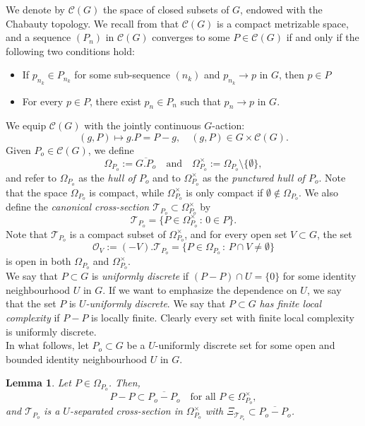 \documentclass[12pt,reqno,a4paper]{amsart}
\numberwithin{equation}{section}
\newcommand{\cT}{\mathcal{T}}
\newcommand{\ra}{\rightarrow}
\newcommand{\qand}{\quad \textrm{and} \quad}
\theoremstyle{theorem}
\newtheorem{lemma}[theorem]{Lemma}
\theoremstyle{task}
\theoremstyle{definition}
\begin{document}
We denote by $\mathscr{C}(G)$ the space of closed subsets of $G$, endowed with the Chabauty topology. We recall from \cite[Section E.1]{BP} that 
$\mathscr{C}(G)$ is a compact metrizable space, and a sequence $(P_n)$ in $\mathscr{C}(G)$ converges to some $P \in \mathscr{C}(G)$ if and only if the following two conditions hold:
\begin{itemize}
\item[(i)] If $p_{n_k} \in P_{n_k}$ for some sub-sequence $(n_k)$ and $p_{n_k} \ra p$ in $G$, then $p\in P$ \vspace{0.1cm}
\item[(ii)] For every $p \in P$, there exist $p_n \in P_n$ such that $p_n \ra p$ in $G$.
\end{itemize}
We equip $\mathscr{C}(G)$ with the jointly continuous $G$-action:
\[
(g,P) \mapsto g.P = P - g, \quad (g,P) \in G \times \mathscr{C}(G).
\]
Given $P_o \in \mathscr{C}(G)$, we define
\[
\Omega_{P_o} := \overline{G.P_o} \qand \Omega_{P_o}^{\times} := \Omega_{P_o} 
\setminus \{\emptyset\},
\]
and refer to $\Omega_{P_o}$ as the \emph{hull of $P_o$} and to $\Omega_{P_o}^{\times}$
as the \emph{punctured hull of $P_o$}. Note that the space $\Omega_{P_o}$ is compact, while $\Omega_{P_o}^{\times}$ is only compact if $\emptyset \notin \Omega_{P_o}$. We also define the \emph{canonical cross-section $\cT_{P_o} \subset \Omega_{P_o}^{\times}$}
by
\[
\cT_{P_o} = \{ P \in \Omega_{P_o}^{\times} \, : \, 0 \in P \}.
\]
Note that $\cT_{P_o}$ is a compact subset of $\Omega_{P_o}^{\times}$, and for every open set $V \subset G$, the set
\[
\mathcal{O}_V := (-V).\cT_{P_o} = \{ P \in \Omega_{P_o} \, : \, P \cap V \neq \emptyset \}
\]
is open in both $\Omega_{P_o}$ and $\Omega_{P_o}^{\times}$. \\

We say that $P \subset G$ is \emph{uniformly discrete} if $(P - P) \cap U = \{0\}$ for some identity neighbourhood $U$ in $G$. If we want to emphasize the dependence on $U$, we say that the set $P$ is \emph{$U$-uniformly discrete}. We say that $P \subset G$
\emph{has finite local complexity} if $P-P$ is locally finite. Clearly every set with finite local complexity is uniformly discrete. \\

In what follows, let $P_o \subset G$ be a $U$-uniformly discrete set for some 
open and bounded identity neighbourhood $U$ in $G$.


\begin{lemma}
\label{Lemma_TransSep}
Let $P \in \Omega_{P_o}$. Then,  
\[
P-P \subset \overline{P_o - P_o} \quad \textrm{for all $P \in \Omega^{\times}_{P_o}$},
\] 
and $\cT_{P_o}$ is a $U$-separated cross-section in $\Omega_{P_o}^{\times}$ with 
$\Xi_{\cT_{P_o}} \subset \overline{P_o - P_o}$.
\end{lemma}
\end{document}
